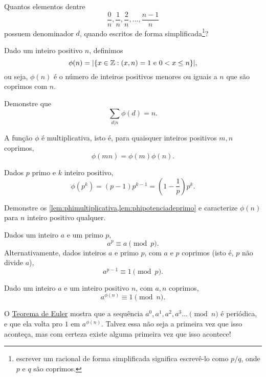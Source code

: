 \documentclass[10pt, a4paper]{report}
\begin{document}
	\begin{ques}
		Quantos elementos dentre \[
			\frac{0}{n}, \frac{1}{n}, \frac{2}{n}, \dots, \frac{n-1}{n}
		\]
		possuem denominador $d$, quando escritos de forma simplificada\footnote{escrever um racional de forma simplificada significa escrevê-lo como $p/q$, onde $p$ e $q$ são coprimos.}?
	\end{ques}

	\begin{defn}
		Dado um inteiro positivo $n$, definimos \[
			\phi(n) = |\{x \in \mathbb{Z} : (x, n) = 1 \text{\ e\ } 0 < x \le n\}|,
		\]
		ou seja, $\phi(n)$ é o número de inteiros positivos menores ou iguais a $n$ que são coprimos com $n$.
	\end{defn}

	\begin{exer}
		Demonstre que \[
			\sum_{d|n} \phi(d) = n.
		\]
	\end{exer}

	\begin{lem}\label{lem:phimultiplicativa}
		A função $\phi$ é multiplicativa, isto é, para quaisquer inteiros positivos $m, n$ coprimos, \[
			\phi(mn) = \phi(m)\phi(n).
		\]
	\end{lem}

	\begin{lem}\label{lem:phipotenciadeprimo}
		Dados $p$ primo e $k$ inteiro positivo, \[
			\phi(p^k) = (p-1)p^{k-1} = \left( 1 - \frac{1}{p} \right)p^k.
		\]
	\end{lem}

	\begin{exer}
		Demonstre os \cref{lem:phimultiplicativa,lem:phipotenciadeprimo} e caracterize $\phi(n)$ para $n$ inteiro positivo qualquer.
	\end{exer}

	\begin{thm}\label{thm:pequenofermat}
		Dados um inteiro $a$ e um primo $p$,  \[
			a^p \equiv a \pmod{p}.
		\]
		Alternativamente, dados inteiros $a$ e primo $p$, com $a$ e $p$ coprimos (isto é, $p$ não divide $a$), \[
			a^{p-1} \equiv 1 \pmod{p}.
		\]
	\end{thm}

	\begin{thm}\label{thm:euler}
		Dado um inteiro $a$ e um inteiro positivo $n$, com $a, n$ coprimos, \[
			a^{\phi(n)} \equiv 1 \pmod{n}.
		\]
	\end{thm}

	O \hyperref[thm:euler]{Teorema de Euler} mostra que a sequência $a^0, a^1, a^2, a^3 \dots \pmod{n}$ é periódica, e que ela volta pro $1$ em $a^{\phi(n)}$. Talvez essa não seja a primeira vez que isso aconteça, mas com certeza existe alguma primeira vez que isso acontece!
\end{document}
